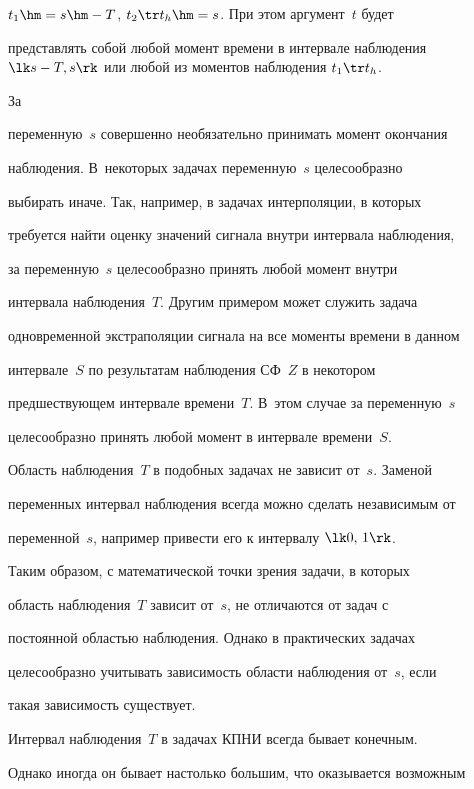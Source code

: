 $t_1 \hm= s \hm-T$, $ t_2\tr t_h \hm=s$. При этом аргумент~$t$ будет


представлять собой любой момент времени в интервале наблюдения  $\lk


s -T, s\rk$ или любой из моментов наблюдения  $t_1 \tr t_h$. 





За


переменную~$s$ совершенно необязательно принимать момент окончания


наблюдения. В~некоторых задачах переменную~$s$ целесообразно


выбирать иначе. Так, например, в задачах интерполяции, в которых


требуется найти оценку значений сигнала внутри интервала наблюдения,


за переменную~$s$ целесообразно принять любой момент внутри


интервала наблюдения~$T$. Другим примером может служить задача


одновременной экстраполяции сигнала на все моменты времени в данном


интервале~$S$ по результатам наблюдения СФ~$Z$ в некотором


предшествующем интервале времени~$T$. В~этом случае за переменную~$s$ 


целесообразно принять  любой момент в интервале времени~$S$.


Область наблюдения~$T$ в подобных задачах не зависит от~$s$. Заменой


переменных интервал наблюдения всегда можно сделать независимым от


переменной~$s$, например привести его к интервалу  $\lk0,\, 1\rk$.


Таким образом, с математической точки зрения задачи, в которых


область наблюдения~$T$ зависит от~$s$, не отличаются от задач с


постоянной областью наблюдения. Однако в практических задачах


целесообразно учитывать зависимость области наблюдения от~$s$, если


такая зависимость существует.





Интервал наблюдения~$T$ в задачах КПНИ всегда бывает конечным.


Однако иногда он бывает настолько большим, что оказывается возможным


